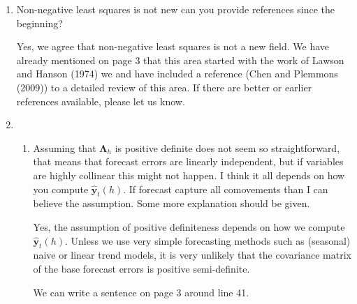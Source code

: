 \documentclass[10pt,a4paper]{article}
\begin{document}
\begin{enumerate}


\item
  Non-negative least squares is not new can you provide references since the beginning?

  {\color{blue} Yes, we agree that non-negative least squares is not a new field. We have already mentioned on page 3 that this area started with the work of Lawson and Hanson (1974) we and have included a reference (Chen and Plemmons (2009)) to a detailed review of this area. If there are better or earlier references available, please let us know.}

\item
  \begin{enumerate}
  \item
    Assuming that $\bm{\Lambda}_h$ is positive definite does not seem so straightforward, that means that forecast errors are linearly independent, but if variables are highly collinear this might not happen. I think it all depends on how you compute $\hat{\bm{y}}_t(h)$. If forecast capture all comovements than I can believe the assumption. Some more explanation should be given.

    {\color{blue} Yes, the assumption of positive definiteness depends on how we compute $\hat{\bm{y}}_t(h)$. Unless we use very simple forecasting methods such as (seasonal) naive or linear trend models, it is very unlikely that the covariance matrix of the base forecast errors is positive semi-definite.}

    {\color{red} We can write a sentence on page 3 around line 41.}


\end{enumerate}
\end{enumerate}
\end{document}
